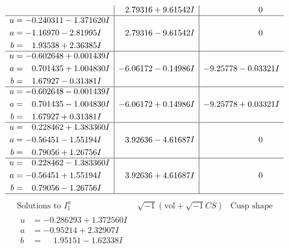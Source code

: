 \documentclass[1p]{elsarticle_modified}
\theoremstyle{definition}
\newcommand{\I}{\sqrt{-1}}
\begin{document}
$$\begin{array}{c|c|c}
 & \phantom{-}2.79316 + 9.61542 I & \phantom{-0.000000 } 0 \\ \hline\begin{aligned}
u &= -0.240311 - 1.371620 I \\
a &= -1.16970 - 2.81995 I \\
b &= \phantom{-}1.93538 + 2.36385 I\end{aligned}
 & \phantom{-}2.79316 - 9.61542 I & \phantom{-0.000000 } 0 \\ \hline\begin{aligned}
u &= -0.602648 + 0.001439 I \\
a &= \phantom{-}0.701435 + 1.004830 I \\
b &= \phantom{-}1.67927 - 0.31381 I\end{aligned}
 & -6.06172 - 0.14986 I & -9.25778 - 0.03321 I \\ \hline\begin{aligned}
u &= -0.602648 - 0.001439 I \\
a &= \phantom{-}0.701435 - 1.004830 I \\
b &= \phantom{-}1.67927 + 0.31381 I\end{aligned}
 & -6.06172 + 0.14986 I & -9.25778 + 0.03321 I \\ \hline\begin{aligned}
u &= \phantom{-}0.228462 + 1.383360 I \\
a &= -0.56451 - 1.55194 I \\
b &= \phantom{-}0.79056 + 1.26756 I\end{aligned}
 & \phantom{-}3.92636 - 4.61687 I & \phantom{-0.000000 } 0 \\ \hline\begin{aligned}
u &= \phantom{-}0.228462 - 1.383360 I \\
a &= -0.56451 + 1.55194 I \\
b &= \phantom{-}0.79056 - 1.26756 I\end{aligned}
 & \phantom{-}3.92636 + 4.61687 I & \phantom{-0.000000 } 0\\
 \hline 
 \end{array}$$\newpage$$\begin{array}{c|c|c}  
\text{Solutions to }I^u_{1}& \I (\text{vol} + \sqrt{-1}CS) & \text{Cusp shape}\\
 \hline 
\begin{aligned}
u &= -0.286293 + 1.372560 I \\
a &= -0.95214 + 2.32907 I \\
b &= \phantom{-}1.95151 - 1.62338 I\end{aligned}

\end{array}$$
\end{document}
